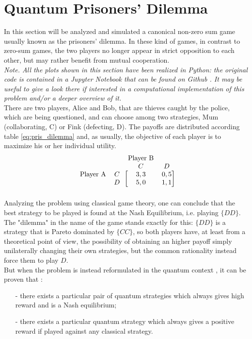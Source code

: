 \hfill

\section{Quantum Prisoners' Dilemma}
In this section will be analyzed and simulated a canonical non-zero sum game usually known as the prisoners' dilemma. In these kind of games, in contrast to zero-sum games, the two players no longer appear in strict opposition to each other, but may rather benefit from mutual cooperation. \\
\textit{
Note. All the plots shown in this section have been realized in Python: the original code is contained in a Jupyter Notebook that can be found on Github \cite{Pujatti_github}. It may be useful to give a look there if interested in a computational implementation of this problem and/or a deeper overview of it.}\\
There are two players, Alice and Bob, that are thieves caught by the police, which are being questioned, and can choose among two strategies, Mum (collaborating, C) or Fink (defecting, D). The payoffs are distributed according table \ref{eq:pris_dilemma} and, as usually, the objective of each player is to maximize his or her individual utility.
\begin{equation}
\begin{blockarray}{cccc}
& & \text{Player B}&\\
& & C & D\\
\begin{block}{cc[cc]}
\text{Player A} & C & 3,3 &  0,5 \\
 & D & 5,0 & 1,1 \\
\end{block}
\end{blockarray}
\label{eq:pris_dilemma}
\end{equation}
Analyzing the problem using classical game theory, one can conclude that the best strategy to be played is found at the Nash Equilibrium, i.e. playing $\{DD\}$. The "dilemma" in the name of the game stands exactly for this: $\{DD\}$ is a strategy that is Pareto dominated by $\{CC\}$, so both players have, at least from a theoretical point of view, the possibility of obtaining an higher payoff simply unilaterally changing their own strategies, but the common rationality instead force them to play $D$.\\
But when the problem is instead reformulated in the quantum context \cite{Eisert_2020}, it can be proven that :
\begin{itemize}[noitemsep]
	\item[-] there exists
a particular pair of quantum strategies which always gives high reward and is a Nash equilibrium;
	\item[-] there exists a particular quantum strategy which always gives a positive reward if played
against any classical strategy.
\end{itemize}
